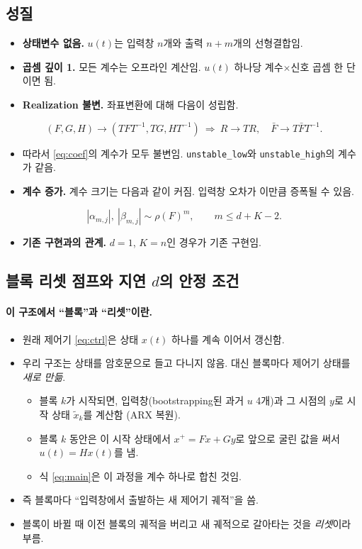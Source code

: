 \documentclass[11pt,a4paper]{article}
\newcommand{\Fb}{\bar F}
\begin{document}
\subsection{성질}
\begin{itemize}
\item \textbf{상태변수 없음.} $u(t)$는 입력창 $n$개와 출력 $n+m$개의 선형결합임.
\item \textbf{곱셈 깊이 1.} 모든 계수는 오프라인 계산임. $u(t)$ 하나당 계수$\times$신호 곱셈 한 단이면 됨.
\item \textbf{Realization 불변.} 좌표변환에 대해 다음이 성립함.
\end{itemize}
\begin{equation}
(F,G,H)\to(TFT^{-1},TG,HT^{-1})\ \Rightarrow\ R\to TR,\quad \Fb\to T\Fb T^{-1}.
\end{equation}
\begin{itemize}
\item[] 따라서 \eqref{eq:coef}의 계수가 모두 불변임. \texttt{unstable\_low}와 \texttt{unstable\_high}의 계수가 같음.
\item \textbf{계수 증가.} 계수 크기는 다음과 같이 커짐. 입력창 오차가 이만큼 증폭될 수 있음.
\end{itemize}
\begin{equation}
|\alpha_{m,j}|,\ |\beta_{m,j}|\sim\rho(F)^{m},\qquad m\le d+K-2 .
\end{equation}
\begin{itemize}
\item \textbf{기존 구현과의 관계.} $d=1$, $K=n$인 경우가 기존 구현임.
\end{itemize}

\subsection{블록 리셋 점프와 지연 $d$의 안정 조건}\label{sec:dstab}

\paragraph{이 구조에서 ``블록''과 ``리셋''이란.}
\begin{itemize}
\item 원래 제어기 \eqref{eq:ctrl}은 상태 $x(t)$ 하나를 계속 이어서 갱신함.
\item 우리 구조는 상태를 암호문으로 들고 다니지 않음. 대신 블록마다 제어기 상태를 \emph{새로 만듦}.
  \begin{itemize}
  \item 블록 $k$가 시작되면, 입력창(bootstrapping된 과거 $u$ 4개)과 그 시점의 $y$로 시작 상태 $\tilde x_k$를 계산함 (ARX 복원).
  \item 블록 $k$ 동안은 이 시작 상태에서 $x^+=Fx+Gy$로 앞으로 굴린 값을 써서 $u(t)=Hx(t)$를 냄.
  \item 식 \eqref{eq:main}은 이 과정을 계수 하나로 합친 것임.
  \end{itemize}
\item 즉 블록마다 ``입력창에서 출발하는 새 제어기 궤적''을 씀.
\item 블록이 바뀔 때 이전 블록의 궤적을 버리고 새 궤적으로 갈아타는 것을 \emph{리셋}이라 부름.
\end{itemize}
\end{document}

